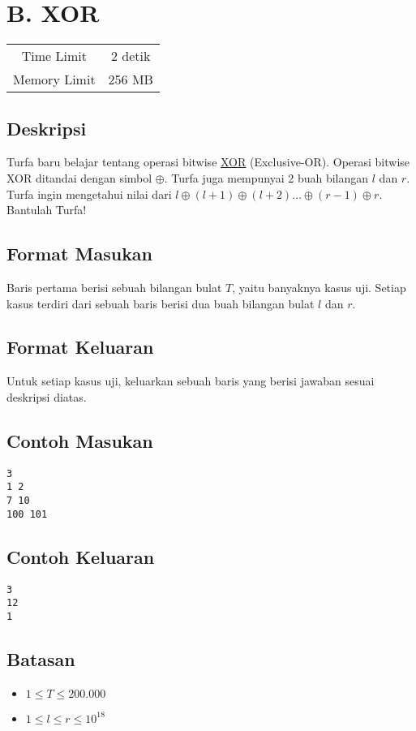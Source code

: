 \documentclass{article}
\begin{document}
\section*{\hfil B. XOR\hfil}

\begin{center}
\begin{tabular}{ |cc| } 
 \hline
 Time Limit & 2 detik \\ 
 Memory Limit & 256 MB \\
 \hline
\end{tabular}
\end{center}

\subsection*{Deskripsi}
\par Turfa baru belajar tentang operasi bitwise \href{https://en.wikipedia.org/wiki/Exclusive_or}{XOR} (Exclusive-OR). Operasi bitwise XOR ditandai dengan simbol $\oplus$. Turfa juga mempunyai 2 buah bilangan $l$ dan $r$. Turfa ingin mengetahui nilai dari $l \oplus (l + 1) \oplus (l + 2) \dots \oplus (r - 1) \oplus r$. Bantulah Turfa!

\subsection*{Format Masukan}
\par Baris pertama berisi sebuah bilangan bulat $T$, yaitu banyaknya kasus uji.
\newline Setiap kasus terdiri dari sebuah baris berisi dua buah bilangan bulat $l$ dan $r$.

\subsection*{Format Keluaran}

\par Untuk setiap kasus uji, keluarkan sebuah baris yang berisi jawaban sesuai deskripsi diatas. 

\subsection*{Contoh Masukan}

\begin{lstlisting}
3
1 2
7 10
100 101

\end{lstlisting}

\subsection*{Contoh Keluaran}

\begin{lstlisting}
3
12
1

\end{lstlisting}

\subsection*{Batasan}

\begin{itemize}
	\item $1 \leq T\leq 200.000$
	\item $1 \leq l \leq r \leq 10^{18}$
\end{itemize}
\end{document}
